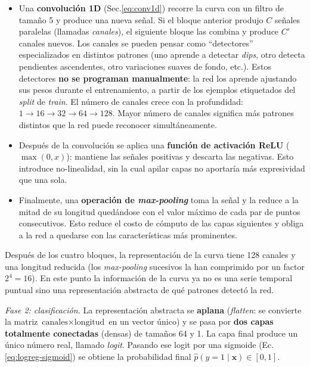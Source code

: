 \documentclass[11pt,a4paper]{article}
\begin{document}
\begin{itemize}
  \item Una \textbf{convolución 1D}
    (Sec.\ref{eq:conv1d}) recorre la curva con un filtro de tamaño 5
    y produce una nueva señal. Si el bloque anterior produjo $C$
    señales paralelas (llamadas \textit{canales}), el siguiente
    bloque las combina y produce $C'$ canales nuevos. Los canales se
    pueden pensar como ``detectores'' especializados en distintos
    patrones (uno aprende a detectar \textit{dips}, otro detecta
    pendientes ascendentes, otro variaciones suaves de fondo, etc.).
    Estos detectores \textbf{no se programan manualmente}: la red los
    aprende ajustando sus pesos durante el entrenamiento, a partir
    de los ejemplos etiquetados del \textit{split} de \textit{train}.
    El número de canales crece con la profundidad:
    $1 \to 16 \to 32 \to 64 \to 128$. Mayor número de canales
    significa más patrones distintos que la red puede reconocer
    simultáneamente.
  \item Después de la convolución se aplica una \textbf{función de
    activación ReLU} ($\max(0, x)$): mantiene las señales positivas
    y descarta las negativas. Esto introduce no-linealidad, sin la
    cual apilar capas no aportaría más expresividad que una sola.
  \item Finalmente, una \textbf{operación de
    \textit{max-pooling}} toma la señal y la reduce a la mitad de su
    longitud quedándose con el valor máximo de cada par de puntos
    consecutivos. Esto reduce el costo de cómputo de las capas
    siguientes y obliga a la red a quedarse con las características
    más prominentes.
\end{itemize}

Después de los cuatro bloques, la representación de la curva tiene
128 canales y una longitud reducida (los \textit{max-pooling}
sucesivos la han comprimido por un factor $2^4 = 16$). En este punto
la información de la curva ya no es una serie temporal puntual sino
una representación abstracta de qué patrones detectó la red.

\emph{Fase 2: clasificación.}
La representación abstracta se \textbf{aplana} (\textit{flatten}: se
convierte la matriz $\text{canales} \times \text{longitud}$ en un
vector único) y se pasa por \textbf{dos capas totalmente conectadas}
(densas) de tamaños 64 y 1. La capa final produce un único número
real, llamado \textit{logit}. Pasando ese logit por una sigmoide
(Ec.\ref{eq:logreg-sigmoid}) se obtiene la probabilidad final
$\hat{p}(y = 1 \mid \mathbf{x}) \in [0, 1]$.
\end{document}
